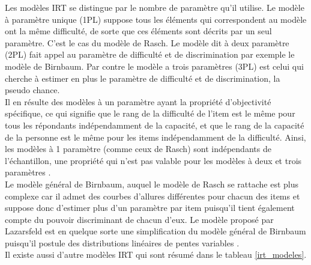 Les modèles IRT se distingue par le nombre de paramètre qu’il utilise. Le modèle à paramètre unique (1PL) suppose tous les éléments qui correspondent au modèle ont la même difficulté, de sorte que ces éléments sont décrits par un seul paramètre. C’est le cas du modèle de Rasch. Le modèle dit à deux paramètre (2PL) fait appel au paramètre de difficulté et de discrimination par exemple le modèle de Birnbaum. Par contre le modèle a trois paramètres (3PL) est celui qui cherche à estimer en plus le paramètre de difficulté et de discrimination, la pseudo chance. \\
Il en résulte des modèles à un paramètre ayant la propriété d'objectivité spécifique, ce qui signifie que le rang de la difficulté de l'item est le même pour tous les répondants indépendamment de la capacité, et que le rang de la capacité de la personne est le même pour les items indépendamment de la difficulté. Ainsi, les modèles à 1 paramètre (comme ceux de Rasch) sont indépendants de l'échantillon, une propriété qui n'est pas valable pour les modèles à deux et trois paramètres \cite{fisher1922mathematical}. \\
Le modèle général de Birnbaum, auquel le modèle de Rasch se rattache est plus complexe car il admet des courbes d’allures différentes pour chacun des items et suppose donc d’estimer plus d’un paramètre par item puisqu’il tient également compte du pouvoir discriminant de chacun d’eux. Le modèle proposé par Lazarsfeld est en quelque sorte une simplification du modèle général de Birnbaum puisqu’il postule des distributions linéaires de pentes variables \cite{yvonnick_2019}. \\
Il existe aussi d’autre modèles IRT qui sont résumé dans le tableau \ref{irt_modeles}.

